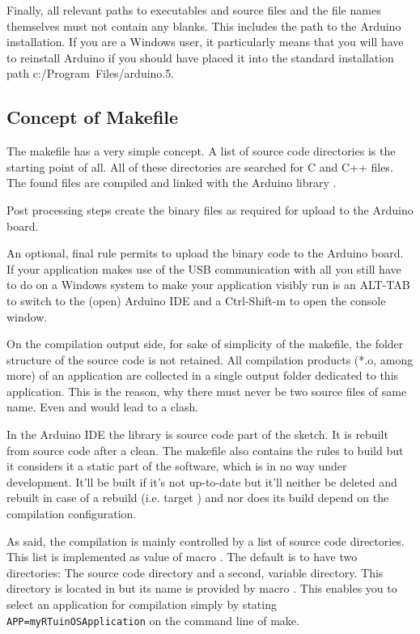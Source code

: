 Finally, all relevant paths to executables and source files and the file
names themselves must not contain any blanks. This includes the path to
the Arduino installation. If you are a Windows user, it particularly means
that you will have to reinstall Arduino if you should have placed it into
the standard installation path c:/Pro\-gram~Files/ar\-dui\-no.5.

\subsection{Concept of Makefile}

The makefile has a very simple concept. A list of source code directories
is the starting point of all. All of these directories are searched for C
and C++ files. The found files are compiled and linked with the Arduino
library .

Post processing steps create the binary files as required for upload to
the Arduino board.

An optional, final rule permits to upload the binary code to the Arduino
board. If your application makes use of the USB communication with
 all you still have to do on a Windows system to make your
application visibly run is an ALT-TAB to switch to the (open) Arduino IDE
and a Ctrl-Shift-m to open the console window.

On the compilation output side, for sake of simplicity of the makefile,
the folder structure of the source code is not retained. All compilation
products (*.o, among more) of an \rtos{} application are collected in a
single output folder dedicated to this application. This is the reason,
why there must never be two source files of same name. Even
 and  would lead to a clash.

In the Arduino IDE the library  is source code part of the
sketch. It is rebuilt from source code after a clean. The \rtos{} makefile
also contains the rules to build  but it considers it a
static part of the software, which is in no way under development. It'll
be built if it's not up-to-date but it'll neither be deleted and rebuilt
in case of a rebuild (i.e. target ) and nor does its build
depend on the compilation configuration.

As said, the compilation is mainly controlled by a list of source code
directories. This list is implemented as value of macro
. The default is to have two directories: The \rtos{}
source code directory  and a second, variable
directory. This directory is located in  but
its name is provided by macro . This enables you to select an
application for compilation simply by stating
\verb+APP=myRTuinOSApplication+ on the command line of make.

